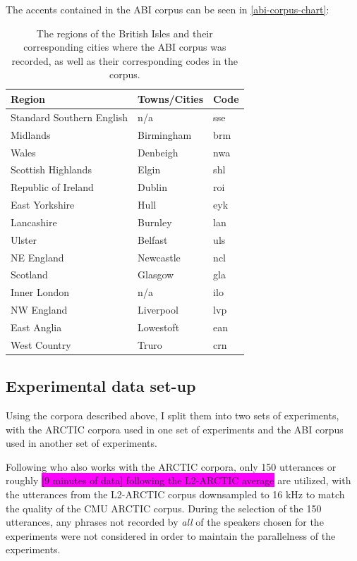\documentclass
[
    a4paper,
    twoside,
    12pt,
]
{report}
\begin{document}
The accents contained in the ABI corpus can be seen in
\autoref{abi-corpus-chart}:

\begin{table}[H]
\centering
\begin{tabular}{|l|l|l|}
\hline
\textbf{Region} & \textbf{Towns/Cities} & \textbf{Code} \\ \hline
Standard Southern English & n/a & sse \\ \hline
Midlands & Birmingham & brm \\ \hline
Wales & Denbeigh & nwa \\ \hline
Scottish Highlands & Elgin & shl \\ \hline
Republic of Ireland & Dublin & roi \\ \hline
East Yorkshire & Hull & eyk \\ \hline
Lancashire & Burnley & lan \\ \hline
Ulster & Belfast & uls \\ \hline
NE England & Newcastle & ncl \\ \hline
Scotland & Glasgow & gla \\ \hline
Inner London & n/a & ilo \\ \hline
NW England & Liverpool & lvp \\ \hline
East Anglia & Lowestoft & ean \\ \hline
West Country & Truro & crn \\ \hline
\end{tabular}
\caption{The regions of the British Isles and their corresponding cities where the ABI corpus was recorded, as well as their corresponding codes in the corpus.}
\label{abi-corpus-chart}
\end{table}

\hypertarget{experimental-data-set-up}{%
\subsection{Experimental data set-up}\label{experimental-data-set-up}}

Using the corpora described above, I split them into two sets of
experiments, with the ARCTIC corpora used in one set of experiments and
the ABI corpus used in another set of experiments.

Following \textcite{zhao2018a} who also works with the ARCTIC corpora,
only 150 utterances or roughly
\colorbox{magenta}{[9 minutes of data] following the L2-ARCTIC average}
are utilized, with the utterances from the L2-ARCTIC corpus downsampled
to 16 kHz to match the quality of the CMU ARCTIC corpus. During the
selection of the 150 utterances, any phrases not recorded by \emph{all}
of the speakers chosen for the experiments were not considered in order
to maintain the parallelness of the experiments.
\end{document}
